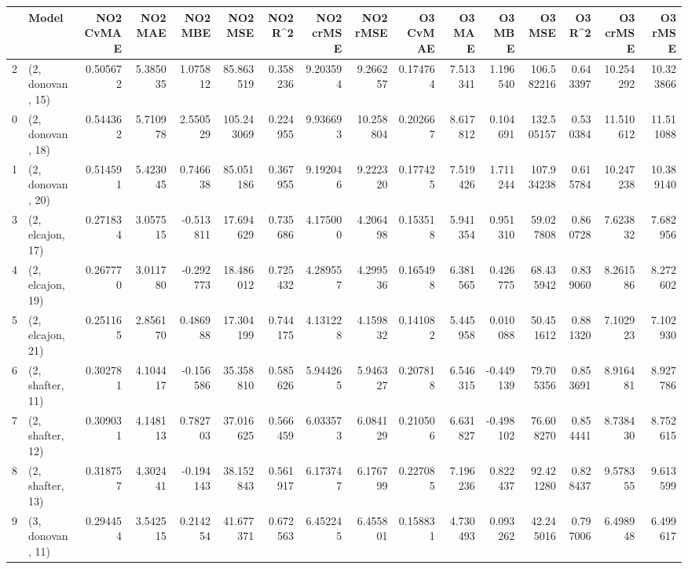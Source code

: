 \begin{tabular}{llrrrrrrrrrrrrrr}
\toprule
{} &             Model &  NO2 CvMAE &   NO2 MAE &   NO2 MBE &     NO2 MSE &   NO2 R\textasciicircum2 &  NO2 crMSE &   NO2 rMSE &  O3 CvMAE &    O3 MAE &    O3 MBE &      O3 MSE &    O3 R\textasciicircum2 &   O3 crMSE &    O3 rMSE \\
\midrule
2  &  (2, donovan, 15) &   0.505672 &  5.385035 &  1.075812 &   85.863519 &  0.358236 &   9.203594 &   9.266257 &  0.174764 &  7.513341 &  1.196540 &  106.582216 &  0.643397 &  10.254292 &  10.323866 \\
0  &  (2, donovan, 18) &   0.544362 &  5.710978 &  2.550529 &  105.243069 &  0.224955 &   9.936693 &  10.258804 &  0.202667 &  8.617812 &  0.104691 &  132.505157 &  0.530384 &  11.510612 &  11.511088 \\
1  &  (2, donovan, 20) &   0.514591 &  5.423045 &  0.746638 &   85.051186 &  0.367955 &   9.192046 &   9.222320 &  0.177425 &  7.519426 &  1.711244 &  107.934238 &  0.615784 &  10.247238 &  10.389140 \\
3  &  (2, elcajon, 17) &   0.271834 &  3.057515 & -0.513811 &   17.694629 &  0.735686 &   4.175000 &   4.206498 &  0.153518 &  5.941354 &  0.951310 &   59.027808 &  0.860728 &   7.623832 &   7.682956 \\
4  &  (2, elcajon, 19) &   0.267770 &  3.011780 & -0.292773 &   18.486012 &  0.725432 &   4.289557 &   4.299536 &  0.165498 &  6.381565 &  0.426775 &   68.435942 &  0.839060 &   8.261586 &   8.272602 \\
5  &  (2, elcajon, 21) &   0.251165 &  2.856170 &  0.486988 &   17.304199 &  0.744175 &   4.131228 &   4.159832 &  0.141082 &  5.445958 &  0.010088 &   50.451612 &  0.881320 &   7.102923 &   7.102930 \\
6  &  (2, shafter, 11) &   0.302781 &  4.104417 & -0.156586 &   35.358810 &  0.585626 &   5.944265 &   5.946327 &  0.207818 &  6.546315 & -0.449139 &   79.705356 &  0.853691 &   8.916481 &   8.927786 \\
7  &  (2, shafter, 12) &   0.309031 &  4.148113 &  0.782703 &   37.016625 &  0.566459 &   6.033573 &   6.084129 &  0.210506 &  6.631827 & -0.498102 &   76.608270 &  0.854441 &   8.738430 &   8.752615 \\
8  &  (2, shafter, 13) &   0.318757 &  4.302441 & -0.194143 &   38.152843 &  0.561917 &   6.173747 &   6.176799 &  0.227085 &  7.196236 &  0.822437 &   92.421280 &  0.828437 &   9.578355 &   9.613599 \\
9  &  (3, donovan, 11) &   0.294454 &  3.542515 &  0.214254 &   41.677371 &  0.672563 &   6.452245 &   6.455801 &  0.158831 &  4.730493 &  0.093262 &   42.245016 &  0.797006 &   6.498948 &   6.499617 \\

\end{tabular}
